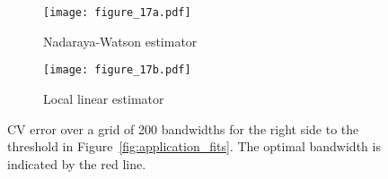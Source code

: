 \begin{figure}
	\centering
	\begin{subfigure}{0.75\textwidth}
		\centering
		\texttt{[image: figure\_17a.pdf]}
		\caption{Nadaraya-Watson estimator}
		\label{fig:application_right_nw}
	\end{subfigure}
	
	\begin{subfigure}{0.75\textwidth}
		\centering
		\texttt{[image: figure\_17b.pdf]}
		\caption{Local linear estimator}
		\label{fig:application_right_ll}
	\end{subfigure}
	\caption{CV error over a grid of 200 bandwidths for the right side to the threshold in Figure~\ref{fig:application_fits}.
			 The optimal bandwidth is indicated by the red line.}
	\label{fig:application_right}
\end{figure}